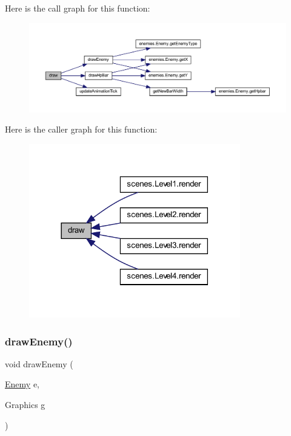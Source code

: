 Here is the call graph for this function\+:
\nopagebreak
\begin{figure}[H]
\begin{center}
\leavevmode
\includegraphics[width=350pt]{classmanagers_1_1_enemy_manager_a72fe1ffca978e99fd16994a10e7f8051_cgraph}
\end{center}
\end{figure}
Here is the caller graph for this function\+:\nopagebreak
\begin{figure}[H]
\begin{center}
\leavevmode
\includegraphics[width=261pt]{classmanagers_1_1_enemy_manager_a72fe1ffca978e99fd16994a10e7f8051_icgraph}
\end{center}
\end{figure}
\mbox{\label{classmanagers_1_1_enemy_manager_a7ebdd9acefa4682b23b1ad2c0be558f4}} 
\subsubsection{\texorpdfstring{draw\+Enemy()}{drawEnemy()}}
{\footnotesize\ttfamily void draw\+Enemy (\begin{DoxyParamCaption}\item[{\hyperlink{classenemies_1_1_enemy}{Enemy}}]{e,  }\item[{Graphics}]{g }\end{DoxyParamCaption})\hspace{0.3cm}{\ttfamily [private]}}



